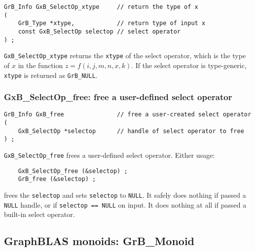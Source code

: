 \documentclass[12pt]{article}
\begin{document}
\begin{mdframed}[userdefinedwidth=6in]
{\footnotesize
\begin{verbatim}
GrB_Info GxB_SelectOp_xtype     // return the type of x
(
    GrB_Type *xtype,            // return type of input x
    const GxB_SelectOp selectop // select operator
) ;

\end{verbatim}
}\end{mdframed}

\verb'GxB_SelectOp_xtype' returns the \verb'xtype' of the select operator,
which is the type of $x$ in the function $z=f(i,j,m,n,x,k)$.  If the select
operator is type-generic, \verb'xtype' is returned as \verb'GrB_NULL'.

\subsubsection{{\sf GxB\_SelectOp\_free:} free a user-defined select operator}
\label{selectop_free}

\begin{mdframed}[userdefinedwidth=6in]
{\footnotesize
\begin{verbatim}
GrB_Info GxB_free               // free a user-created select operator
(
    GxB_SelectOp *selectop      // handle of select operator to free
) ;
\end{verbatim}
}\end{mdframed}

\verb'GxB_SelectOp_free' frees a user-defined select operator.  Either usage:

    {\small
    \begin{verbatim}
    GxB_SelectOp_free (&selectop) ;
    GrB_free (&selectop) ; \end{verbatim}}

\noindent
frees the \verb'selectop' and sets \verb'selectop' to \verb'NULL'.  It safely
does nothing if passed a \verb'NULL' handle, or if \verb'selectop == NULL' on
input.  It does nothing at all if passed a built-in select operator.

\newpage
\subsection{GraphBLAS monoids: {\sf GrB\_Monoid}} %
\label{monoid}
\end{document}
